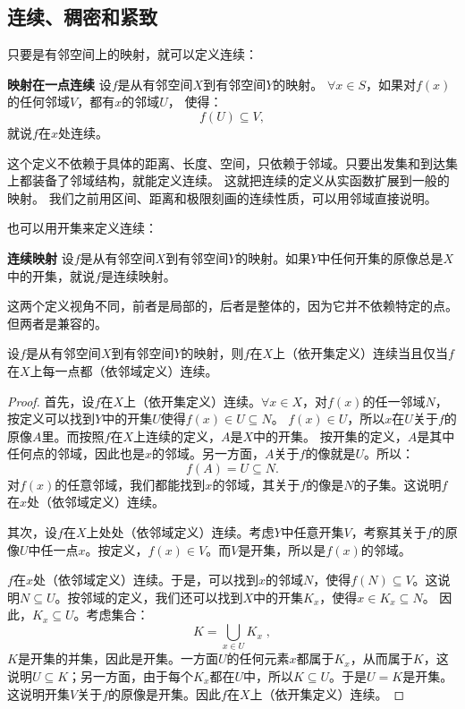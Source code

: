 \documentclass[12pt,UTF8,fontset=none]{ctexbook}
\begin{document}
\begin{appendix}
\section{连续、稠密和紧致}

只要是有邻空间上的映射，就可以定义连续：
\begin{df}{\textbf{映射在一点连续}}
    设$f$是从有邻空间$X$到有邻空间$Y$的映射。
    $\forall x\in S$，如果对$f(x)$的任何邻域$V$，都有$x$的邻域$U$，
    使得：
    $$ f(U) \subseteq V,$$
    就说$f$在$x$处连续。
\end{df}
这个定义不依赖于具体的距离、长度、空间，只依赖于邻域。只要出发集和到达集上都装备了邻域结构，就能定义连续。
这就把连续的定义从实函数扩展到一般的映射。
我们之前用区间、距离和极限刻画的连续性质，可以用邻域直接说明。

也可以用开集来定义连续：
\begin{df}{\textbf{连续映射}}
    设$f$是从有邻空间$X$到有邻空间$Y$的映射。如果$Y$中任何开集的原像总是$X$中的开集，就说$f$是连续映射。
\end{df}

这两个定义视角不同，前者是局部的，后者是整体的，因为它并不依赖特定的点。但两者是兼容的。

\begin{tm}\label{tm:a-3-0}
    设$f$是从有邻空间$X$到有邻空间$Y$的映射，则$f$在$X$上（依开集定义）连续当且仅当$f$在$X$上每一点都（依邻域定义）连续。
\end{tm}

\begin{proof}
    首先，设$f$在$X$上（依开集定义）连续。$\forall x \in X$，对$f(x)$的任一邻域$N$，按定义可以找到$Y$中的开集$U$使得$f(x)\in U\subseteq N$。
    $f(x)\in U$，所以$x$在$U$关于$f$的原像$A$里。而按照$f$在$X$上连续的定义，$A$是$X$中的开集。
    按开集的定义，$A$是其中任何点的邻域，因此也是$x$的邻域。另一方面，$A$关于$f$的像就是$U$。所以：
    $$ f(A) = U \subseteq N. $$
    对$f(x)$的任意邻域，我们都能找到$x$的邻域，其关于$f$的像是$N$的子集。这说明$f$在$x$处（依邻域定义）连续。

    其次，设$f$在$X$上处处（依邻域定义）连续。考虑$Y$中任意开集$V$，考察其关于$f$的原像$U$中任一点$x$。按定义，$f(x)\in V$。而$V$是开集，所以是$f(x)$的邻域。
    
    $f$在$x$处（依邻域定义）连续。于是，可以找到$x$的邻域$N$，使得$f(N) \subseteq V$。这说明$N\subseteq U$。按邻域的定义，我们还可以找到$X$中的开集$K_x$，使得$x\in K_x\subseteq N$。
    因此，$K_x\subseteq U$。考虑集合：
    $$K = \bigcup_{x\in U} K_x\; ,$$
    $K$是开集的并集，因此是开集。一方面$U$的任何元素$x$都属于$K_x$，从而属于$K$，这说明$U\subseteq K$；另一方面，由于每个$K_x$都在$U$中，所以$K\subseteq U$。于是$U = K$是开集。
    这说明开集$V$关于$f$的原像是开集。因此$f$在$X$上（依开集定义）连续。


\end{proof}
\end{appendix}
\end{document}
